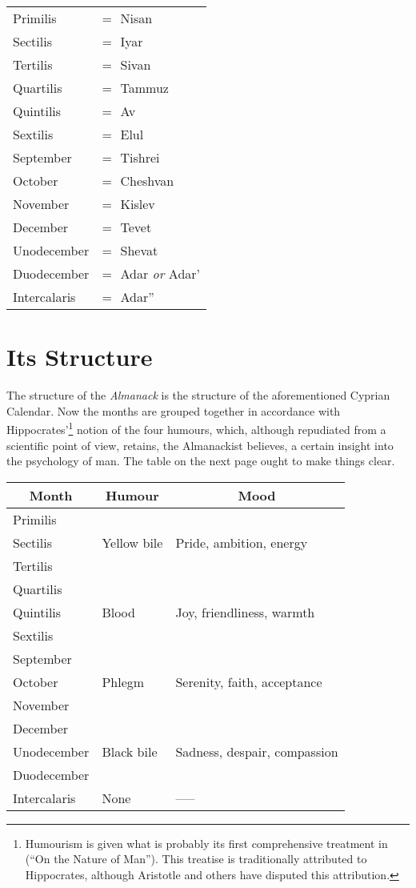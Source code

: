 \documentclass[0main.tex]{subfiles}
\begin{document}
\begin{table}[h]
\centering
\begin{tabular}{l l}
Primilis &= $ $ Nisan\\
Sectilis &= $ $ Iyar\\
Tertilis &= $ $ Sivan\\
Quartilis &= $ $ Tammuz\\
Quintilis &= $ $ Av\\
Sextilis &= $ $ Elul\\
September &= $ $ Tishrei\\
October &= $ $ Cheshvan\\
November &= $ $ Kislev\\
December &= $ $ Tevet\\
Unodecember &= $ $ Shevat\\
Duodecember &= $ $ Adar \emph{or} Adar'\\
Intercalaris &= $ $ Adar''
\end{tabular}
\end{table}

\section{Its Structure}

The structure of the \emph{Almanack} is the structure of the aforementioned Cyprian Calendar. Now the months are grouped together in accordance with Hippocrates'\footnote{Humourism is given what is probably its first comprehensive treatment in {\it {}} (``On the Nature of Man''). This treatise is traditionally attributed to Hippocrates, although Aristotle and others have disputed this attribution.} notion of the four humours, which, although repudiated from a scientific point of view, retains, the Almanackist believes, a certain insight into the psychology of man. The table on the next page ought to make things clear.

\begin{table}[h]
\centering
\begin{tabular}{l|l|l}
\multicolumn{1}{c}{\sc Month} & \multicolumn{1}{|c|}{\sc Humour} & \multicolumn{1}{c}{\sc Mood} \\ \hline \hline
Primilis & & \\
Sectilis & Yellow bile & Pride, ambition, energy \\
Tertilis & & \\ \hline
Quartilis & & \\
Quintilis & Blood & Joy, friendliness, warmth \\
Sextilis & & \\ \hline
September & & \\
October & Phlegm & Serenity, faith, acceptance \\
November & & \\ \hline
December & & \\
Unodecember & Black bile & Sadness, despair, compassion \\
Duodecember & & \\ \hline
Intercalaris & None & -----
\end{tabular}
\end{table}
\end{document}
